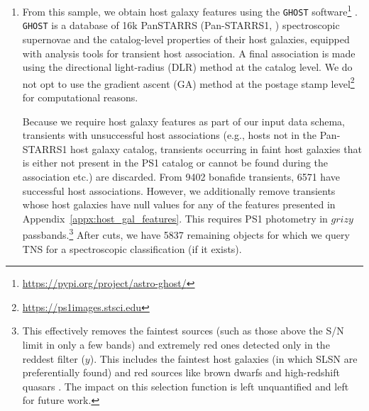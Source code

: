 \documentclass[twocolumn]{aastex63}
\newcommand{\ghost}{\texttt{GHOST}}
\newcommand{\PS}{Pan-STARRS}
\begin{document}
\begin{enumerate}
    \item From this sample, we obtain host galaxy features using the \ghost{} software\footnote{\url{https://pypi.org/project/astro-ghost/}} \citep{Gagliano2021}. \ghost{} is a database of 16k PanSTARRS (\PS1{}, \citealt{Chambers2016}) spectroscopic supernovae and the catalog-level properties of their host galaxies, equipped with analysis tools for transient host association. 
    A final association is made using the directional light-radius (DLR) method at the catalog level. We do not opt to use the gradient ascent (GA) method at the postage stamp level\footnote{\url{https://ps1images.stsci.edu}} for computational reasons. \par
    Because we require host galaxy features as part of our input data schema, transients with unsuccessful host associations (e.g., hosts not in the \PS1{} host galaxy catalog, transients occurring in faint host galaxies that is either not present in the PS1 catalog or cannot be found during the association etc.) are discarded. From 9402 bonafide transients, 6571 have successful host associations. However, we additionally remove transients whose host galaxies have null values for any of the features presented in Appendix~\ref{appx:host_gal_features}. This requires PS1 photometry in $grizy$ passbands.\footnote{This effectively removes the faintest sources (such as those above the S/N limit in only a few bands) and extremely red ones detected only in the reddest filter ($y$). This includes the faintest host galaxies (in which SLSN are preferentially found) and red sources like brown dwarfs and high-redshift quasars \citep{Magnier2016}. The impact on this selection function is left unquantified and left for future work.} After cuts, we have 5837 remaining objects for which we query TNS for a spectroscopic classification (if it exists).

\end{enumerate}
\end{document}
